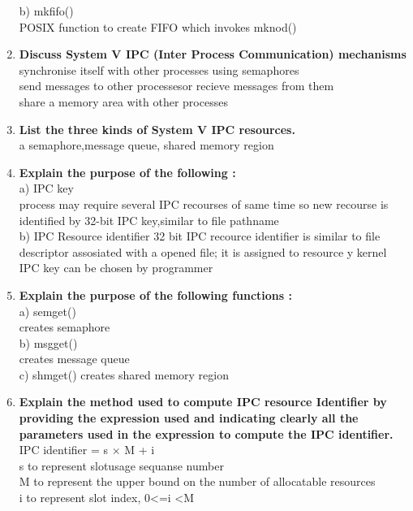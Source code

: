 \documentclass[a4paper,12pt]{article}
\begin{document}
\begin{flushleft}
\begin{enumerate}
 b) mkfifo()\\
 {\color{red}POSIX function to create FIFO which invokes mknod()}\\
\item \textbf{ Discuss System V IPC (Inter Process Communication) mechanisms}\\
{\color{red}synchronise itself with other processes using semaphores\\
send messages to other processesor recieve messages from them\\
share a memory area with other processes}\\
\item \textbf{ List the three kinds of System V IPC resources.}\\
{\color{red}a semaphore,message queue, shared memory region}\\
\item \textbf{ Explain the purpose of the following :}\\
a) IPC key \\
{\color{red}process may require several IPC recourses of same time so new recourse is identified by 32-bit IPC key,similar to file pathname }\\
b) IPC Resource identifier
{\color{red}32 bit IPC recource identifier is similar to file descriptor  assosiated with a opened file; it is assigned to resource y kernel IPC key can be chosen by programmer}\\
\item \textbf{ Explain the purpose of the following functions :}\\
a) semget()\\ 
{\color{red}creates semaphore}\\
b) msgget()\\ 
{\color{red}creates message queue}\\
c) shmget()
{\color{red}creates shared memory region}\\
\item \textbf{ Explain the method used to compute IPC resource Identifier by providing the expression used and indicating clearly all the parameters used in the expression to compute the IPC identifier.}\\
{\color{red}IPC identifier = s $ \times $ M + i\\s to represent slotusage sequanse number\\
M to represent the upper bound on the number of allocatable resources\\
i to represent slot index, 0\textless =i \textless M}\\

\end{enumerate}
\end{flushleft}
\end{document}
